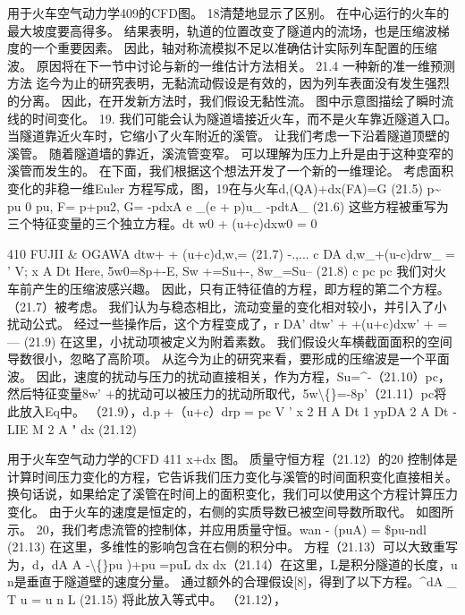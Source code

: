 \documentclass[UTF8,11pt,a4paper,openany,fontset=fandol]{ctexbook}
\begin{document}
用于火车空气动力学409的CFD图。 18清楚地显示了区别。 在中心运行的火车的最大坡度要高得多。 结果表明，轨道的位置改变了隧道内的流场，也是压缩波梯度的一个重要因素。 因此，轴对称流模拟不足以准确估计实际列车配置的压缩波。 原因将在下一节中讨论与新的一维估计方法相关。 21.4 一种新的准一维预测方法 迄今为止的研究表明，无黏流动假设是有效的，因为列车表面没有发生强烈的分离。 因此，在开发新方法时，我们假设无黏性流。 图中示意图描绘了瞬时流线的时间变化。 19. 我们可能会认为隧道墙接近火车，而不是火车靠近隧道入口。 当隧道靠近火车时，它缩小了火车附近的溪管。 让我们考虑一下沿着隧道顶壁的溪管。 随着隧道墙的靠近，溪流管变窄。 可以理解为压力上升是由于这种变窄的溪管而发生的。 在下面，我们根据这个想法开发了一个新的一维理论。 考虑面积变化的非稳一维Euler 方程写成，图，19在与火车d,(QA)+dx(FA)=G (21.5) p\textasciitilde{} pu 0 pu, F= p+pu2, G= -pdxA e \_(e + p)u\_ -pdtA\_ (21.6) 这些方程被重写为三个特征变量的三个独立方程。dt w0 + (u+c)dxw0 = 0

410 FUJII \& OGAWA dtw+ + (u+c)d,w,= (21.7) -.,... c DA d,w\_+(u-c)drw\_ = ' V; x A Dt Here, 5w0=8p+-E, Sw +=Su+-, 8w\_=Su-- (21.8) c pc pc 我们对火车前产生的压缩波感兴趣。 因此，只有正特征值的方程，即方程的第二个方程。 （21.7）被考虑。 我们认为与稳态相比，流动变量的变化相对较小，并引入了小扰动公式。 经过一些操作后，这个方程变成了，r DA' dtw' + +(u+c)dxw' + =--- (21.9) 在这里，小扰动项被定义为附着素数。 我们假设火车横截面面积的空间导数很小，忽略了高阶项。 从迄今为止的研究来看，要形成的压缩波是一个平面波。 因此，速度的扰动与压力的扰动直接相关，作为方程，Su=\textasciicircum{}-（21.10）pc，然后特征变量8w' +的扰动可以被压力的扰动所取代，5w\textbackslash\{\}=-8p'（21.11）pc将此放入Eq中。 （21.9），d.p +（u+c）drp = pc V ' x 2 H A Dt 1 ypDA 2 A Dt -LIE M 2 A " dx (21.12)

用于火车空气动力学的CFD 411 x+dx 图。 质量守恒方程（21.12）的20 控制体是计算时间压力变化的方程，它告诉我们压力变化与溪管的时间面积变化直接相关。 换句话说，如果给定了溪管在时间上的面积变化，我们可以使用这个方程计算压力变化。 由于火车的速度是恒定的，右侧的实质导数已被空间导数所取代。 如图所示。 20，我们考虑流管的控制体，并应用质量守恒。wan - (puA) = \$pu-ndl (21.13) 在这里，多维性的影响包含在右侧的积分中。 方程（21.13）可以大致重写为，d，dA A -\textbackslash\{\}pu )+pu =puL dx dx（21.14）在这里，L是积分隧道的长度，u n是垂直于隧道壁的速度分量。 通过额外的合理假设[8]，得到了以下方程。\textasciicircum{}dA \_ T u = u n L (21.15) 将此放入等式中。 （21.12），
\end{document}
